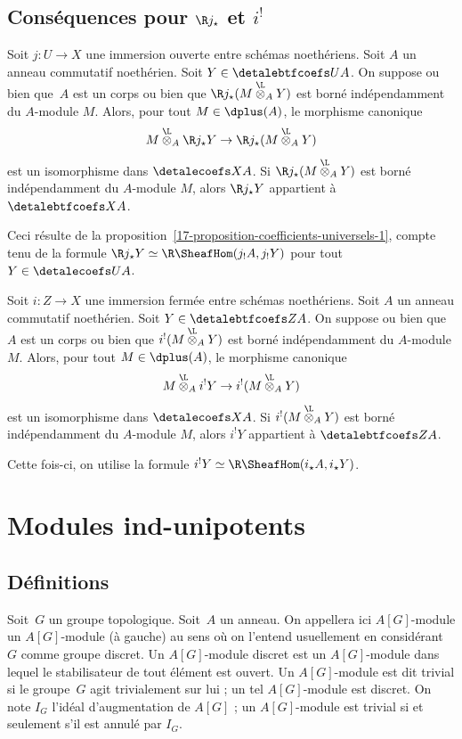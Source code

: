 \documentclass[10pt]{../fichiers-configuration-latex/smfart}
\begin{document}
\subsection{Conséquences pour \texorpdfstring{$\R j_\star$}{Rj*} et \texorpdfstring{$i^!$}{i!}}%

\begin{proposition2}\label{17-proposition-coefficients-universels-r-j-star}
Soit $j\colon U\to X$ une immersion ouverte entre schémas noethériens. Soit
$A$ un anneau commutatif noethérien. Soit $Y\in\detalebtfcoefs U A$. On suppose
ou bien que $A$ est un corps ou bien que $\R j_\star
(M\overset{\L}\otimes_A Y)$ est borné indépendamment du $A$-module
$M$. Alors, pour tout $M\in\dplus(A)$, le morphisme canonique
\[M\overset{\L}{\otimes}_A\R j_\star Y\to
\R j_\star (M\overset{\L}{\otimes}_A Y)\]
est un isomorphisme dans $\detalecoefs X A$. Si $\R j_\star
(M\overset{\L}\otimes_A Y)$ est borné indépendamment du $A$-module
$M$, alors $\R j_\star Y$ appartient à $\detalebtfcoefs X A$.
\end{proposition2}

Ceci résulte de la
proposition~\ref{17-proposition-coefficients-universels-1}, compte tenu de la
formule $\R j_\star Y\simeq \R\SheafHom(j_!A,j_!Y)$ pour tout
$Y\in\detalecoefs U A$.

\begin{proposition2}
Soit $i\colon Z\to X$ une immersion fermée entre schémas noethériens. Soit
$A$ un anneau commutatif noethérien. Soit $Y\in\detalebtfcoefs Z A$. On suppose
ou bien que $A$ est un corps ou bien que $i^!
(M\overset{\L}\otimes_A Y)$ est borné indépendamment du $A$-module
$M$. Alors, pour tout $M\in\dplus(A)$, le morphisme canonique
\[M\overset{\L}{\otimes}_A i^! Y\to i^!
(M\overset{\L}{\otimes}_A Y)\]
est un isomorphisme dans $\detalecoefs X A$. Si $i^!
(M\overset{\L}\otimes_A Y)$ est borné indépendamment du $A$-module
$M$, alors $i^! Y$ appartient à $\detalebtfcoefs Z A$.
\end{proposition2}

Cette fois-ci, on utilise la formule $i^!Y\simeq \R\SheafHom(i_\star
A,i_\star Y)$.

\section{Modules ind-unipotents}%
\subsection{Définitions}%
Soit $G$ un groupe topologique. Soit $A$ un anneau. On appellera ici 
$A[G]$-module un $A[G]$-module (à gauche)
au sens où on l'entend usuellement en
considérant $G$ comme groupe discret. Un $A[G]$-module discret est un
$A[G]$-module dans lequel le stabilisateur de tout élément est ouvert.
Un $A[G]$-module est dit trivial si le groupe $G$ agit
trivialement sur lui ; un tel $A[G]$-module est discret.
On note $I_G$ l'idéal d'augmentation de $A[G]$ ; un
$A[G]$-module est trivial si et seulement s'il est annulé par $I_G$.
\end{document}
